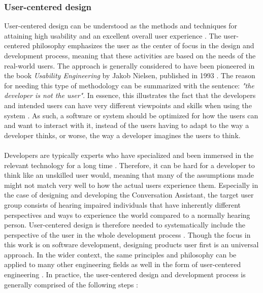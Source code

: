 \documentclass[english, 12pt, a4paper, pdftex, elec, utf8]{aaltothesis}
\begin{document}
\subsubsection{User-centered design} \label{sec:user}

User-centered design can be understood as the methods and techniques for attaining high usability and an excellent overall user experience \cite{richter2014user, deuff2013user}. The user-centered philosophy emphasizes the user as the center of focus in the design and development process, meaning that these activities are based on the needs of the real-world users. The approach is generally considered to have been pioneered in the book \textit{Usability Engineering} \cite{nielsen1993usability} by Jakob Nielsen, published in 1993 \cite[p.~9]{richter2014user}. The reason for needing this type of methodology can be summarized with the sentence: \textit{"the developer is not the user"}. In essence, this illustrates the fact that the developers and intended users can have very different viewpoints and skills when using the system \cite{richter2014user, deuff2013user}. As such, a software or system should be optimized for how the users can and want to interact with it, instead of the users having to adapt to the way a developer thinks, or worse, the way a developer imagines the users to think. \\\\
Developers are typically experts who have specialized and been immersed in the relevant technology for a long time \cite[p.~2]{richter2014user}. Therefore, it can be hard for a developer to think like an unskilled user would, meaning that many of the assumptions made might not match very well to how the actual users experience them. Especially in the case of designing and developing the Conversation Assistant, the target user group consists of hearing impaired individuals that have inherently different perspectives and ways to experience the world compared to a normally hearing person. User-centered design is therefore needed to systematically include the perspective of the user in the whole development process \cite{richter2014user, deuff2013user, nielsen1993usability}. Though the focus in this work is on software development, designing products user first is an universal approach. In the wider context, the same principles and philosophy can be applied to many other engineering fields as well in the form of user-centered engineering \cite{richter2014user}. In practice, the user-centered design and development process is generally comprised of the following steps \cite[p.~11--16]{richter2014user}:
\end{document}
